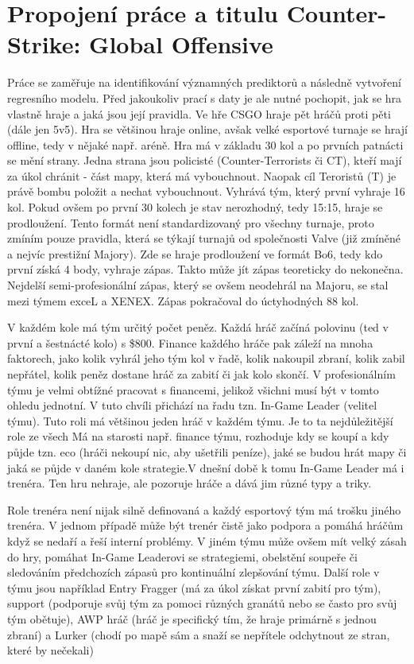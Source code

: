 \newpage
\section{Propojení práce a titulu Counter-Strike: Global Offensive}
Práce se zaměřuje na identifikování významných prediktorů a následně vytvoření regresního modelu. Před jakoukoliv prací s daty je ale nutné pochopit, jak se hra vlastně hraje a
jaká jsou její pravidla. 
Ve hře \ac{CSGO} hraje pět hráčů proti pěti (dále jen 5v5). Hra se většinou hraje online, avšak velké esportové turnaje se hrají offline, tedy v nějaké např. aréně.
Hra má v základu 30 kol a po  prvních patnácti se mění strany. Jedna strana jsou policisté (Counter-Terrorists či CT), kteří mají za úkol chránit  - část mapy,
která má vybouchnout. Naopak cíl Teroristů (T) je právě bombu položit a  nechat vybouchnout. Vyhrává tým, který první vyhraje 16 kol. Pokud ovšem po první 30 kolech
je stav nerozhodný, tedy 15:15, hraje se prodloužení. Tento formát není standardizovaný pro všechny turnaje, proto zmíním pouze pravidla, která se týkají turnajů od společnosti
Valve (již zmíněné a nejvíc prestižní Majory). Zde se hraje prodloužení ve formát Bo6, tedy kdo první získá 4 body, vyhraje zápas. Takto může jít zápas teoreticky
do nekonečna. Nejdelší semi-profesionální zápas, který se ovšem neodehrál na Majoru, se stal mezi týmem exceL a XENEX\cite{professeur_hltvorg_2015}. Zápas pokračoval do úctyhodných 88 kol.

V každém kole má tým určitý počet peněz. Každá hráč začíná polovinu (ted v první a šestnácté kolo) s \$800. Finance každého hráče pak záleží na mnoha
faktorech, jako
kolik vyhrál jeho tým kol v řadě, kolik nakoupil zbraní, kolik zabil nepřátel, kolik peněz dostane hráč za zabití či jak kolo skončí. V profesionálním týmu je
velmi obtížné pracovat s financemi, jelikož všichni musí být v tomto ohledu jednotní. V tuto chvíli přichází na řadu tzn. In-Game Leader (velitel týmu). Tuto roli má většinou
jeden hráč v každém týmu. Je to ta nejdůležitější role ze všech Má na starosti např. finance týmu, rozhoduje kdy se koupí a kdy půjde tzn. eco (hráči nekoupí nic, aby ušetřili peníze),
jaké se budou hrát mapy či jaká se půjde v daném kole strategie.V dnešní době k tomu In-Game Leader má i trenéra. Ten hru nehraje, ale pozoruje hráče a dává jim
různé typy a triky.

Role trenéra není nijak silně definovaná a každý esportový tým má trošku jiného trenéra. V jednom případě může být trenér čistě jako podpora
a
pomáhá hráčům když se nedaří a
řeší interní problémy. V jiném týmu může ovšem mít velký zásah do hry, pomáhat In-Game Leaderovi se strategiemi, obelstění soupeře či sledováním předchozích zápasů pro
kontinuální zlepšování týmu. Další role v týmu jsou například Entry Fragger (má za úkol získat první zabití pro tým), support (podporuje svůj tým za pomoci různých granátů
nebo se často pro svůj tým obětuje), AWP hráč (hráč je specifický tím, že hraje primárně s jednou zbraní) a Lurker (chodí po mapě sám a snaží se
nepřítele odchytnout ze stran, které by nečekali)

